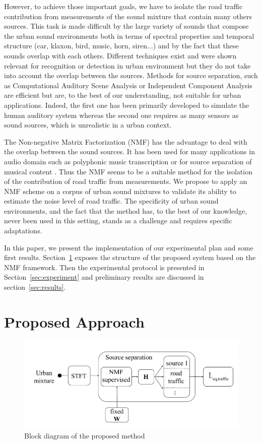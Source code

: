 \documentclass{article}
\begin{document}
\begin{sloppy}
However, to achieve those important goals, we have to isolate the road traffic contribution from measurements  of the sound mixture that contain many others sources. This task is made difficult by the large variety of sounds that compose the urban sound environments both in terms of spectral properties and temporal structure (car, klaxon, bird, music, horn, siren...) and by the fact that these sounds overlap with each others. Different techniques exist and were shown relevant for recognition or detection in urban environment \cite{Aucouturier} \cite{defreville} but they do not take into account the overlap between the sources. Methods for source separation, such as Computational Auditory Scene Analysis \cite{brown} or Independent Component Analysis \cite{comon} are efficient but are, to the best of our understanding, not suitable for urban applications. Indeed, the first one has been primarily developed to simulate the human auditory system whereas the second one requires as many sensors as sound sources, which is unrealistic in a urban context.

The Non-negative Matrix Factorization (NMF) \cite{lee1999} has the advantage to deal with the overlap between the sound sources. It has been used for many applications in audio domain such as polyphonic music transcription \cite{smaragdis2003} or for source separation of musical content \cite{Virtanen2005}. Thus the NMF seems to be a suitable method for the isolation of the contribution of road traffic from measurements. We propose to apply an NMF scheme on a corpus of urban sound mixtures to validate its ability to estimate the noise level of road traffic. The specificity of urban sound environments, and the fact that the method has, to the best of our knowledge, never been used in this setting, stands as a challenge and requires specific adaptations.

In this paper, we present the implementation of our experimental plan and some first results. Section~\ref{sec:method} exposes the structure of the proposed system based on the NMF framework. Then the experimental protocol is presented in Section~\ref{sec:experiment} and preliminary results are discussed in section~\ref{sec:results}.


\section{Proposed Approach}\label{sec:method}

\begin{figure}[!ht]
\centering
\includegraphics[width=.7\textwidth]{images/bloc1.pdf}
\caption{Block diagram of the proposed method \label{block}}
\end{figure}


\end{sloppy}
\end{document}
